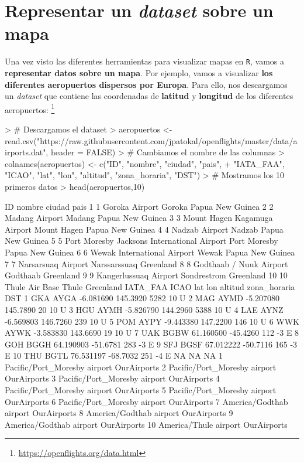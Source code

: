 \documentclass [a4paper] {article}
\begin{document}
\section{Representar un \textit{dataset} sobre un mapa}
Una vez visto las diferentes herramientas para visualizar mapas en \texttt{R}, vamos a \textbf{representar datos sobre un mapa}. Por ejemplo, vamos a visualizar \textbf{los diferentes aeropuertos dispersos por Europa}. Para ello, nos descargamos un \textit{dataset} que contiene las coordenadas de \textbf{latitud} y \textbf{longitud} de los diferentes aeropuertos: \footnote{\url{https://openflights.org/data.html}}
\begin{Schunk}
\begin{Sinput}
> # Descargamos el dataset
> aeropuertos <- read.csv("https://raw.githubusercontent.com/jpatokal/openflights/master/data/airports.dat", header = FALSE)
> # Cambiamos el nombre de las columnas
> colnames(aeropuertos) <- c("ID", "nombre", "ciudad", "pais",
+ "IATA_FAA", "ICAO", "lat", "lon", "altitud", "zona_horaria", "DST")
> # Mostramos los 10 primeros datos
> head(aeropuertos,10)
\end{Sinput}
\begin{Soutput}
   ID                                      nombre       ciudad             pais
1   1                              Goroka Airport       Goroka Papua New Guinea
2   2                              Madang Airport       Madang Papua New Guinea
3   3                Mount Hagen Kagamuga Airport  Mount Hagen Papua New Guinea
4   4                              Nadzab Airport       Nadzab Papua New Guinea
5   5 Port Moresby Jacksons International Airport Port Moresby Papua New Guinea
6   6                 Wewak International Airport        Wewak Papua New Guinea
7   7                          Narsarsuaq Airport Narssarssuaq        Greenland
8   8                     Godthaab / Nuuk Airport     Godthaab        Greenland
9   9                       Kangerlussuaq Airport  Sondrestrom        Greenland
10 10                              Thule Air Base        Thule        Greenland
   IATA_FAA ICAO       lat      lon altitud zona_horaria DST
1       GKA AYGA -6.081690 145.3920    5282           10   U
2       MAG AYMD -5.207080 145.7890      20           10   U
3       HGU AYMH -5.826790 144.2960    5388           10   U
4       LAE AYNZ -6.569803 146.7260     239           10   U
5       POM AYPY -9.443380 147.2200     146           10   U
6       WWK AYWK -3.583830 143.6690      19           10   U
7       UAK BGBW 61.160500 -45.4260     112           -3   E
8       GOH BGGH 64.190903 -51.6781     283           -3   E
9       SFJ BGSF 67.012222 -50.7116     165           -3   E
10      THU BGTL 76.531197 -68.7032     251           -4   E
                     NA      NA          NA
1  Pacific/Port_Moresby airport OurAirports
2  Pacific/Port_Moresby airport OurAirports
3  Pacific/Port_Moresby airport OurAirports
4  Pacific/Port_Moresby airport OurAirports
5  Pacific/Port_Moresby airport OurAirports
6  Pacific/Port_Moresby airport OurAirports
7       America/Godthab airport OurAirports
8       America/Godthab airport OurAirports
9       America/Godthab airport OurAirports
10        America/Thule airport OurAirports
\end{Soutput}
\end{Schunk}
\end{document}
